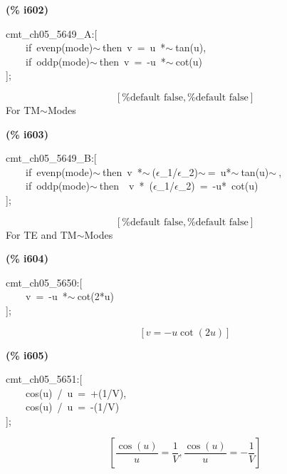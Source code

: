 \documentclass[fleqn]{article}
\begin{document}
\noindent
\begin{minipage}[t]{4.000000em}\color{red}\bfseries
(\% i602)	
\end{minipage}
\begin{minipage}[t]{\textwidth}\color{blue}
cmt\_ch05\_5649\_A:[\\
\ \ \ \ if\ evenp(mode)\ensuremath{\sim\ }then\ v\ =\ u\ *\ensuremath{\sim\ }tan(u),\\
\ \ \ \ if\ oddp(mode)\ensuremath{\sim\ }then\ v\ =\ -u\ *\ensuremath{\sim\ }cot(u)\\
];
\end{minipage}
\[\displaystyle \tag{\% o602} 
\left[ \mbox{%
false}\operatorname{,}\mbox{%
false}\right] \mbox{}
\]
For TM\ensuremath{\sim }Modes


\noindent
\begin{minipage}[t]{4.000000em}\color{red}\bfseries
(\% i603)	
\end{minipage}
\begin{minipage}[t]{\textwidth}\color{blue}
cmt\_ch05\_5649\_B:[\\
\ \ \ \ if\ evenp(mode)\ensuremath{\sim\ }then\ v\ *\ensuremath{\sim\ }(\ensuremath{\epsilon}\_1/\ensuremath{\epsilon}\_2)\ensuremath{\sim\ }=\ u*\ensuremath{\sim\ }tan(u)\ensuremath{\sim\ },\\
\ \ \ \ if\ oddp(mode)\ensuremath{\sim\ }then\ \ v\ *\ (\ensuremath{\epsilon}\_1/\ensuremath{\epsilon}\_2)\ =\ -u*\ cot(u)\\
];
\end{minipage}
\[\displaystyle \tag{\% o603} 
\left[ \mbox{%
false}\operatorname{,}\mbox{%
false}\right] \mbox{}
\]
For TE and TM\ensuremath{\sim }Modes


\noindent
\begin{minipage}[t]{4.000000em}\color{red}\bfseries
(\% i604)	
\end{minipage}
\begin{minipage}[t]{\textwidth}\color{blue}
cmt\_ch05\_5650:[\\
\ \ \ \ v\ =\ -u\ *\ensuremath{\sim\ }cot(2*u)\ \ \ \ \\
];
\end{minipage}
\[\displaystyle \tag{\% o604} 
\left[ v=-u \cot{\left( 2 u\right) }\right] \mbox{}
\]


\noindent
\begin{minipage}[t]{4.000000em}\color{red}\bfseries
(\% i605)	
\end{minipage}
\begin{minipage}[t]{\textwidth}\color{blue}
cmt\_ch05\_5651:[\\
\ \ \ \ cos(u)\ /\ u\ =\ +(1/V),\\
\ \ \ \ cos(u)\ /\ u\ =\ -(1/V)\\
];
\end{minipage}
\[\displaystyle \tag{\% o605} 
\left[ \frac{\cos{(u)}}{u}=\frac{1}{V}\operatorname{,}\frac{\cos{(u)}}{u}=-\frac{1}{V}\right] \mbox{}
\]
\end{document}
